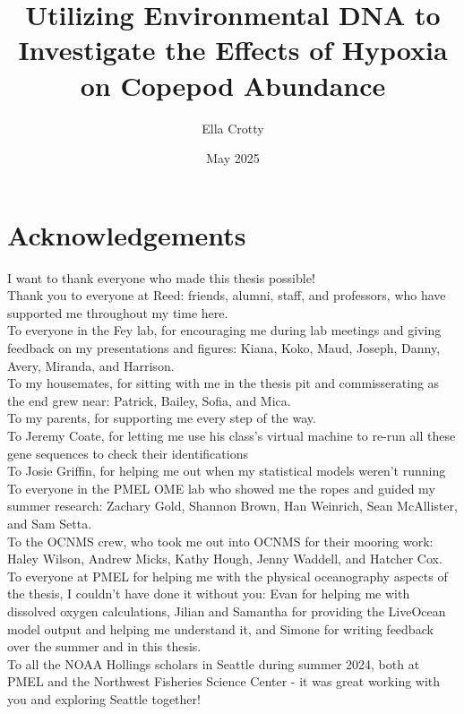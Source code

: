 \documentclass[12pt,twoside]{reedthesis}
\title{Utilizing Environmental DNA to Investigate the Effects of Hypoxia on Copepod Abundance}
\author{Ella Crotty}
\date{May 2025}
\begin{document}
  \maketitle
  \frontmatter %
  \pagestyle{empty} %

    \chapter*{Acknowledgements}
	I want to thank everyone who made this thesis possible! \\
	Thank you to everyone at Reed: friends, alumni, staff, and professors, who have supported me throughout my time here. \\
	To everyone in the Fey lab, for encouraging me during lab meetings and giving feedback on my presentations and figures: Kiana, Koko, Maud, Joseph, Danny, Avery, Miranda, and Harrison. \\
	To my housemates, for sitting with me in the thesis pit and commisserating as the end grew near: Patrick, Bailey, Sofia, and Mica. \\
	To my parents, for supporting me every step of the way. \\
	To Jeremy Coate, for letting me use his class's virtual machine to re-run all these gene sequences to check their identifications \\
	To Josie Griffin, for helping me out when my statistical models weren't running \\
	To everyone in the PMEL OME lab who showed me the ropes and guided my summer research: Zachary Gold, Shannon Brown, Han Weinrich, Sean McAllister, and Sam Setta. \\
	To the OCNMS crew, who took me out into OCNMS for their mooring work: Haley Wilson, Andrew Micks, Kathy Hough, Jenny Waddell, and Hatcher Cox. \\
	To everyone at PMEL for helping me with the physical oceanography aspects of the thesis, I couldn't have done it without you: Evan for helping me with dissolved oxygen calculations, Jilian and Samantha for providing the LiveOcean model output and helping me understand it, and Simone for writing feedback over the summer and in this thesis. \\
	To all the NOAA Hollings scholars in Seattle during summer 2024, both at PMEL and the Northwest Fisheries Science Center - it was great working with you and exploring Seattle together! \\
\end{document}

